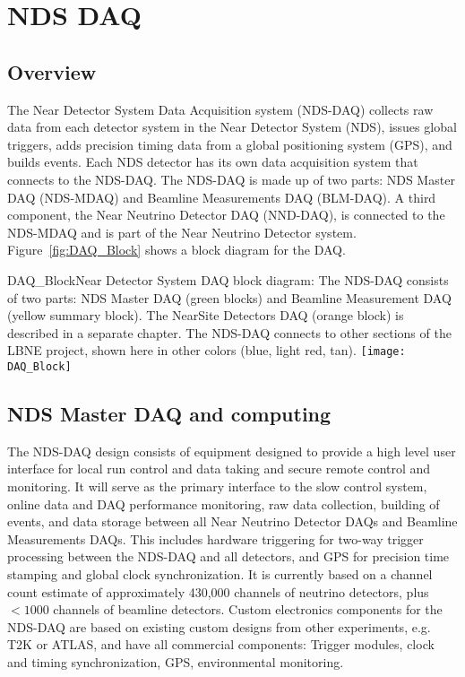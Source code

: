 \section{NDS DAQ}
\label{sec:nd-nnd-nds-daq}

\subsection{Overview}

The Near Detector System 
Data Acquisition system (NDS-DAQ) collects raw data from each detector 
system in the Near Detector System (NDS), issues global triggers, adds precision timing 
data from a global positioning system (GPS), and builds events. Each NDS detector has its 
own data acquisition system that connects to the NDS-DAQ.
The NDS-DAQ is made up of two parts: NDS Master DAQ (NDS-MDAQ) and Beamline Measurements 
DAQ (BLM-DAQ). A third component, the Near Neutrino Detector DAQ (NND-DAQ), is 
connected to the NDS-MDAQ and is part of the Near Neutrino Detector system.
Figure~\ref{fig:DAQ_Block} shows a block diagram for the DAQ.

\begin{cdrfigure}{DAQ_Block}{Near Detector System DAQ block diagram: The NDS-DAQ consists 
of two parts: NDS Master DAQ (green blocks) and Beamline Measurement DAQ (yellow summary 
block). The NearSite Detectors DAQ (orange block) is described in a separate chapter. The 
NDS-DAQ connects to other sections of the LBNE project, shown here in other colors (blue, 
light red, tan).}
\texttt{[image: DAQ\_Block]}
\end{cdrfigure}


\subsection{NDS Master DAQ and computing}

The NDS-DAQ design consists of equipment designed to provide a high level user interface 
for local run control and data taking and secure remote control and monitoring.   It will 
serve as the primary interface to the slow control system, online data and DAQ performance 
monitoring, raw data collection, building of events, and data storage between all Near 
Neutrino Detector DAQs and Beamline Measurements DAQs.  This includes hardware triggering 
for two-way trigger processing between the NDS-DAQ and all detectors, and GPS for precision 
time stamping and global clock synchronization.  It is currently based on a channel count 
estimate of approximately 430,000 channels of neutrino detectors, plus $<1000$ channels of 
beamline detectors.  Custom electronics components for the NDS-DAQ are based on existing 
custom designs from other experiments, e.g. T2K or ATLAS, and have all commercial 
components:  Trigger modules, clock and timing synchronization, GPS, environmental 
monitoring.

